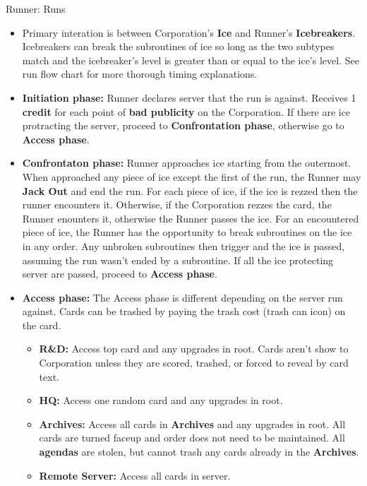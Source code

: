 \documentclass[12pt]{article}
\newenvironment{itemizeCustom}
{\begin{itemize}
  \setlength{\itemsep}{1pt}
  \setlength{\parskip}{0pt}
  \setlength{\parsep}{0pt}}
{\end{itemize}}
\begin{document}
\begin{multicols*}{2}
Runner: Runs
\begin{itemizeCustom}
	\item Primary interation is between Corporation's \textbf{Ice} and Runner's \textbf{Icebreakers}. Icebreakers can break the subroutines of ice so long as the two subtypes match and the icebreaker's level is greater than or equal to the ice's level. See run flow chart for more thorough timing explanations.
	\item \textbf{Initiation phase:} Runner declares server that the run is against. Receives 1 \textbf{credit} for each point of \textbf{bad publicity} on the Corporation. If there are ice protracting the server, proceed to \textbf{Confrontation phase}, otherwise go to \textbf{Access phase}.
	\item \textbf{Confrontaton phase:} Runner approaches ice starting from the outermost. When approached any piece of ice except the first of the run, the Runner may \textbf{Jack Out} and end the run. For each piece of ice, if the ice is rezzed then the runner encounters it. Otherwise, if the Corporation rezzes the card, the Runner enounters it, otherwise the Runner passes the ice. For an encountered piece of ice, the Runner has the opportunity to break subroutines on the ice in any order. Any unbroken subroutines then trigger and the ice is passed, assuming the run wasn't ended by a subroutine. If all the ice protecting server are passed, proceed to \textbf{Access phase}.
	\item \textbf{Access phase:} The Access phase is different depending on the server run against. Cards can be trashed by paying the trash cost (trash can icon) on the card.
	\begin{itemizeCustom}
		\item \textbf{R\&D:} Access top card and any upgrades in root. Cards aren't show to Corporation unless they are scored, trashed, or forced to reveal by card text.
		\item \textbf{HQ:} Access one random card and any upgrades in root. 
		\item \textbf{Archives:} Access all cards in \textbf{Archives} and any upgrades in root. All cards are turned faceup and order does not need to be maintained. All \textbf{agendas} are stolen, but cannot trash any cards already in the \textbf{Archives}.
		\item \textbf{Remote Server:} Access all cards in server.
	\end{itemizeCustom}
\end{itemizeCustom}


\end{multicols*}
\end{document}
